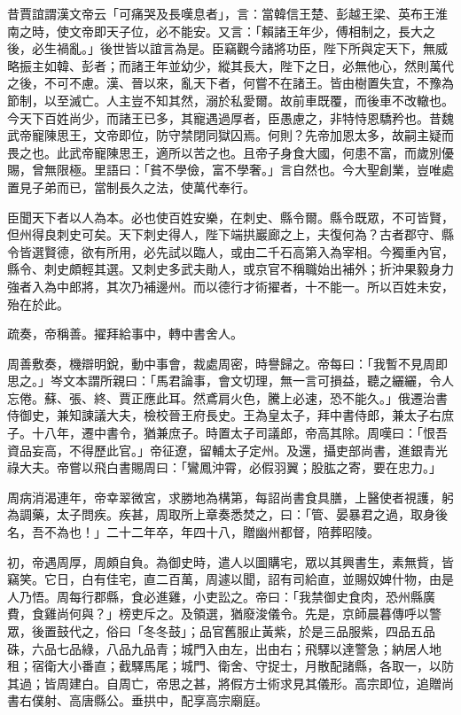 \begin{pinyinscope}
 昔賈誼謂漢文帝云「可痛哭及長嘆息者」，言：當韓信王楚、彭越王梁、英布王淮南之時，使文帝即天子位，必不能安。又言：「賴諸王年少，傅相制之，長大之後，必生禍亂。」後世皆以誼言為是。臣竊觀今諸將功臣，陛下所與定天下，無威略振主如韓、彭者；而諸王年並幼少，縱其長大，陛下之日，必無他心，然則萬代之後，不可不慮。漢、晉以來，亂天下者，何嘗不在諸王。皆由樹置失宜，不豫為節制，以至滅亡。人主豈不知其然，溺於私愛爾。故前車既覆，而後車不改轍也。今天下百姓尚少，而諸王已多，其寵遇過厚者，臣愚慮之，非特恃恩驕矜也。昔魏武帝寵陳思王，文帝即位，防守禁閉同獄囚焉。何則？先帝加恩太多，故嗣主疑而畏之也。此武帝寵陳思王，適所以苦之也。且帝子身食大國，何患不富，而歲別優賜，曾無限極。里語曰：「貧不學儉，富不學奢。」言自然也。今大聖創業，豈唯處置見子弟而已，當制長久之法，使萬代奉行。



 臣聞天下者以人為本。必也使百姓安樂，在刺史、縣令爾。縣令既眾，不可皆賢，但州得良刺史可矣。天下刺史得人，陛下端拱巖廊之上，夫復何為？古者郡守、縣令皆選賢德，欲有所用，必先試以臨人，或由二千石高第入為宰相。今獨重內官，縣令、刺史頗輕其選。又刺史多武夫勛人，或京官不稱職始出補外；折沖果毅身力強者入為中郎將，其次乃補邊州。而以德行才術擢者，十不能一。所以百姓未安，殆在於此。



 疏奏，帝稱善。擢拜給事中，轉中書舍人。



 周善敷奏，機辯明銳，動中事會，裁處周密，時譽歸之。帝每曰：「我暫不見周即思之。」岑文本謂所親曰：「馬君論事，會文切理，無一言可損益，聽之纚纚，令人忘倦。蘇、張、終、賈正應此耳。然鳶肩火色，騰上必速，恐不能久。」俄遷治書侍御史，兼知諫議大夫，檢校晉王府長史。王為皇太子，拜中書侍郎，兼太子右庶子。十八年，遷中書令，猶兼庶子。時置太子司議郎，帝高其除。周嘆曰：「恨吾資品妄高，不得歷此官。」帝征遼，留輔太子定州。及還，攝吏部尚書，進銀青光祿大夫。帝嘗以飛白書賜周曰：「鸞鳳沖霄，必假羽翼；股肱之寄，要在忠力。」



 周病消渴連年，帝幸翠微宮，求勝地為構第，每詔尚書食具膳，上醫使者視護，躬為調藥，太子問疾。疾甚，周取所上章奏悉焚之，曰：「管、晏暴君之過，取身後名，吾不為也！」二十二年卒，年四十八，贈幽州都督，陪葬昭陵。



 初，帝遇周厚，周頗自負。為御史時，遣人以圖購宅，眾以其興書生，素無貲，皆竊笑。它日，白有佳宅，直二百萬，周遽以聞，詔有司給直，並賜奴婢什物，由是人乃悟。周每行郡縣，食必進雞，小吏訟之。帝曰：「我禁御史食肉，恐州縣廣費，食雞尚何與？」榜吏斥之。及領選，猶廢浚儀令。先是，京師晨暮傳呼以警眾，後置鼓代之，俗曰「冬冬鼓」；品官舊服止黃紫，於是三品服紫，四品五品硃，六品七品綠，八品九品青；城門入由左，出由右；飛驛以達警急；納居人地租；宿衛大小番直；截驛馬尾；城門、衛舍、守捉士，月散配諸縣，各取一，以防其過；皆周建白。自周亡，帝思之甚，將假方士術求見其儀形。高宗即位，追贈尚書右僕射、高唐縣公。垂拱中，配享高宗廟庭。




\end{pinyinscope}
